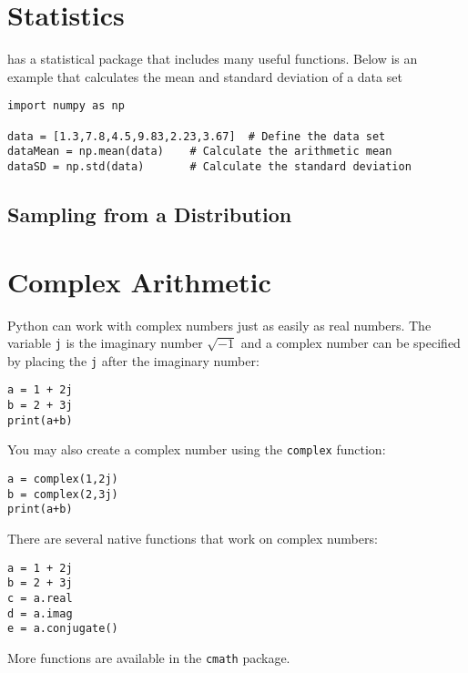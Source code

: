 \section{Statistics}
 has a statistical package that includes many useful
functions.  Below is an example that calculates the mean and standard
deviation of a data set
\begin{Verbatim}
import numpy as np

data = [1.3,7.8,4.5,9.83,2.23,3.67]  # Define the data set
dataMean = np.mean(data)    # Calculate the arithmetic mean
dataSD = np.std(data)       # Calculate the standard deviation
\end{Verbatim}

\subsection*{Sampling from a Distribution}

\section{Complex Arithmetic}
Python can work with complex numbers just as easily as real numbers.
The variable \texttt{j} is the imaginary number $\sqrt{-1}$ and a
complex number can be specified by placing the \texttt{j} after the
imaginary number:
\begin{Verbatim}
a = 1 + 2j
b = 2 + 3j
print(a+b)
\end{Verbatim}
You may also create a complex number using the \texttt{complex}
function:
\begin{Verbatim}
a = complex(1,2j)
b = complex(2,3j)
print(a+b)
\end{Verbatim}
There are several native functions that work on complex numbers:
\begin{Verbatim}
a = 1 + 2j
b = 2 + 3j
c = a.real
d = a.imag
e = a.conjugate()
\end{Verbatim}
More functions are available in the \texttt{cmath} package.
